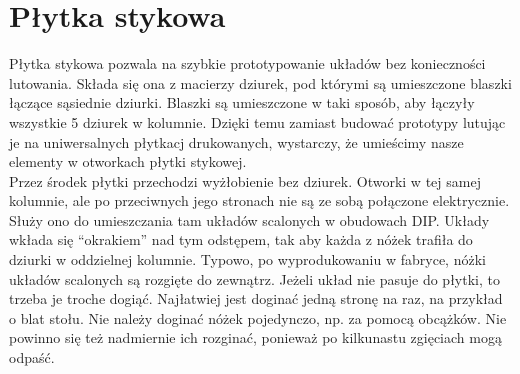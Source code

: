 % 
% 
% 
% 

\section{Płytka stykowa}
Płytka stykowa pozwala na szybkie prototypowanie układów bez konieczności lutowania. Składa się ona z macierzy dziurek,
pod którymi są umieszczone blaszki łączące sąsiednie dziurki. Blaszki są umieszczone w taki sposób, aby łączyły wszystkie
5 dziurek w kolumnie. Dzięki temu zamiast budować prototypy lutując je na uniwersalnych płytkacj drukowanych, wystarczy, że
umieścimy nasze elementy w otworkach płytki stykowej. 
\\

Przez środek płytki przechodzi wyżłobienie bez dziurek. Otworki w tej samej kolumnie, ale po przeciwnych jego
stronach nie są ze sobą połączone elektrycznie. Służy ono do umieszczania tam układów scalonych w obudowach DIP.
Układy wkłada się ``okrakiem'' nad tym odstępem, tak aby każda z nóżek trafiła do dziurki w oddzielnej kolumnie.
Typowo, po wyprodukowaniu w fabryce, nóżki układów scalonych są rozgięte do zewnątrz. Jeżeli układ nie pasuje do płytki,
to trzeba je troche dogiąć.
Najłatwiej jest doginać jedną stronę na raz, na przykład o blat stołu. Nie należy doginać nóżek pojedynczo, np. za pomocą obcążków.
Nie powinno się też nadmiernie ich rozginać, ponieważ po kilkunastu zgięciach mogą odpaść.
\\

